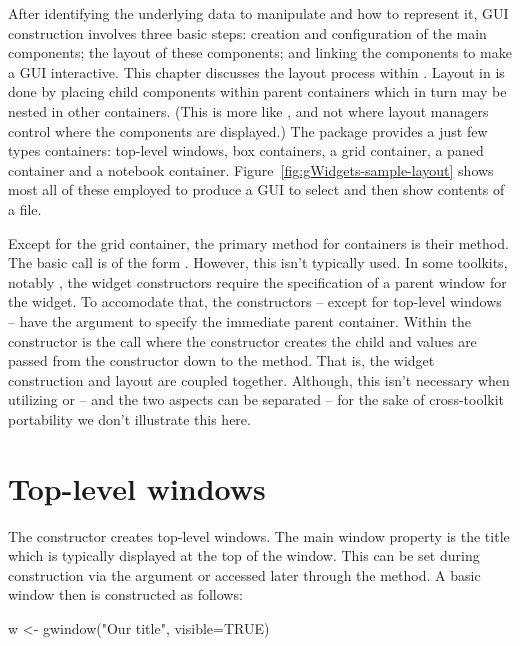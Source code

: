 After identifying the underlying data to manipulate and how to
represent it, GUI construction involves three basic steps: creation
and configuration of the main components; the layout of these
components; and linking the components to make a GUI interactive. This
chapter discusses the layout process within . Layout in
 is done by placing child components within parent
containers which in turn may be nested in other containers. (This is
more like \GTK, and not \Qt where layout managers control where the
components are displayed.) The  package provides a just
few types containers: top-level windows, box containers, a grid
container, a paned container and  a notebook
container. Figure~\ref{fig:gWidgets-sample-layout} shows most all of
these employed to produce a GUI to select and then show contents of a file.


Except for the grid container, the primary method for containers is
their  method. The basic call is of the form
. However, this isn't
typically used. In some toolkits, notably , the widget
constructors require the specification of a parent window for the
widget. To accomodate that, the  constructors --
except for top-level windows -- have the argument 
to specify the immediate parent container.  Within the constructor is
the call  where the constructor
creates the child and   values are passed from the
constructor down to the  method. That is, the widget
construction and layout are coupled together. Although, this isn't
necessary when utilizing  or  -- and the two
aspects can be separated -- for the sake of cross-toolkit portability
we don't illustrate this here.




\section{Top-level windows}
\label{sec:gWidgets-top-level-windows}

The  constructor creates top-level windows. The
main window property is the title which is typically displayed at the
top of the window. This can be set during construction via the
 argument or accessed later through the
 method. A basic window then is constructed as follows:

\begin{Schunk}
\begin{Sinput}
 w <- gwindow("Our title", visible=TRUE)
\end{Sinput}
\end{Schunk}
%

